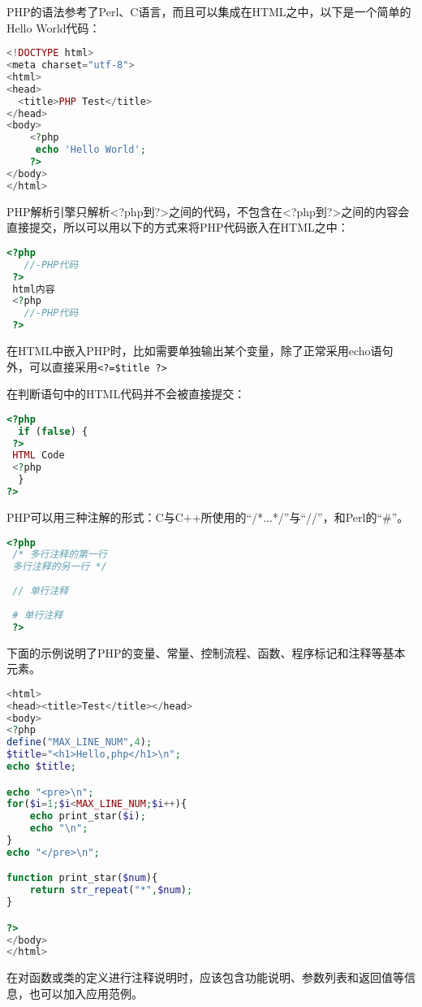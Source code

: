 PHP的语法参考了Perl、C语言，而且可以集成在HTML之中，以下是一个简单的Hello World代码：

\begin{lstlisting}[language=PHP]
<!DOCTYPE html>
<meta charset="utf-8">
<html>
<head>
  <title>PHP Test</title>
</head>
<body>
	<?php
	 echo 'Hello World';
	?>
</body>
</html>
\end{lstlisting}

PHP解析引擎只解析<?php到?>之间的代码，不包含在<?php到?>之间的内容会直接提交，所以可以用以下的方式来将PHP代码嵌入在HTML之中：

\begin{lstlisting}[language=PHP]
 <?php
   //-PHP代码
 ?>
 html内容
 <?php
   //-PHP代码
 ?>
\end{lstlisting}

在HTML中嵌入PHP时，比如需要单独输出某个变量，除了正常采用echo语句外，可以直接采用\verb|<?=$title ?>|

在判断语句中的HTML代码并不会被直接提交：


\begin{lstlisting}[language=PHP]
<?php
  if (false) {
 ?>
 HTML Code
 <?php
  }
?>
\end{lstlisting}

PHP可以用三种注解的形式：C与C++所使用的“/*...*/”与“//”，和Perl的“\#”。

\begin{lstlisting}[language=PHP]
 <?php
 /* 多行注释的第一行
 多行注释的另一行 */
 
 // 单行注释
 
 # 单行注释
 ?>
\end{lstlisting}


下面的示例说明了PHP的变量、常量、控制流程、函数、程序标记和注释等基本元素。



\begin{lstlisting}[language=PHP]
<html>
<head><title>Test</title></head>
<body>
<?php
define("MAX_LINE_NUM",4);
$title="<h1>Hello,php</h1>\n";
echo $title;

echo "<pre>\n";
for($i=1;$i<MAX_LINE_NUM;$i++){
    echo print_star($i);
    echo "\n";
}
echo "</pre>\n";

function print_star($num){
    return str_repeat("*",$num);
}

?>
</body>
</html>
\end{lstlisting}

在对函数或类的定义进行注释说明时，应该包含功能说明、参数列表和返回值等信息，也可以加入应用范例。



